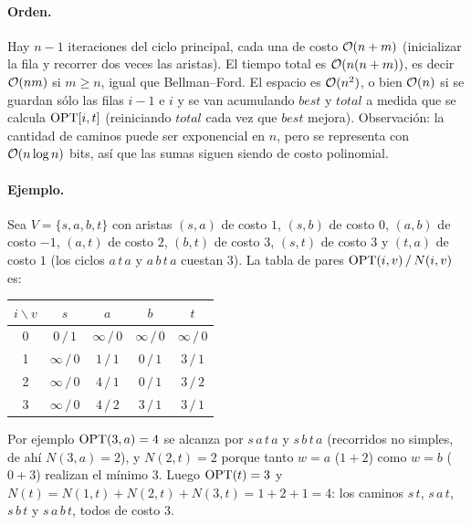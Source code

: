 \paragraph{Orden.} Hay $n-1$ iteraciones del ciclo principal, cada una de costo $\mathcal{O}(n+m)$ (inicializar la
fila y recorrer dos veces las aristas). El tiempo total es $\mathcal{O}(n(n+m))$, es decir $\mathcal{O}(nm)$ si $m\ge n$,
igual que Bellman--Ford. El espacio es $\mathcal{O}(n^2)$, o bien $\mathcal{O}(n)$ si se guardan sólo las filas $i-1$ e $i$
y se van acumulando $best$ y $total$ a medida que se calcula $\mathrm{OPT}[i,t]$ (reiniciando $total$ cada vez que
$best$ mejora). Observación: la cantidad de caminos puede ser exponencial en $n$, pero se representa con
$\mathcal{O}(n\log n)$ bits, así que las sumas siguen siendo de costo polinomial.

\paragraph{Ejemplo.} Sea $V=\{s,a,b,t\}$ con aristas $(s,a)$ de costo $1$, $(s,b)$ de costo $0$, $(a,b)$ de
costo $-1$, $(a,t)$ de costo $2$, $(b,t)$ de costo $3$, $(s,t)$ de costo $3$ y $(t,a)$ de costo $1$ (los
ciclos $a\,t\,a$ y $a\,b\,t\,a$ cuestan $3$). La tabla de pares $\mathrm{OPT}(i,v)\,/\,N(i,v)$ es:

\begin{center}
\begin{tabular}{c|cccc}
$i\backslash v$ & $s$ & $a$ & $b$ & $t$\\ \hline
0 & $0\,/\,1$ & $\infty\,/\,0$ & $\infty\,/\,0$ & $\infty\,/\,0$\\
1 & $\infty\,/\,0$ & $1\,/\,1$ & $0\,/\,1$ & $3\,/\,1$\\
2 & $\infty\,/\,0$ & $4\,/\,1$ & $0\,/\,1$ & $3\,/\,2$\\
3 & $\infty\,/\,0$ & $4\,/\,2$ & $3\,/\,1$ & $3\,/\,1$\\
\end{tabular}
\end{center}

Por ejemplo $\mathrm{OPT}(3,a)=4$ se alcanza por $s\,a\,t\,a$ y $s\,b\,t\,a$ (recorridos no simples, de ahí
$N(3,a)=2$), y $N(2,t)=2$ porque tanto $w=a$ ($1+2$) como $w=b$ ($0+3$) realizan el mínimo $3$. Luego
$\mathrm{OPT}(t)=3$ y $N(t)=N(1,t)+N(2,t)+N(3,t)=1+2+1=4$: los caminos $s\,t$, $s\,a\,t$, $s\,b\,t$ y
$s\,a\,b\,t$, todos de costo $3$.


